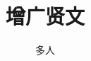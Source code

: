 \documentclass[12pt,oneside]{book}
\begin{document}
\title{增广贤文}
\author{多人}

\makemytitle
\end{document}
